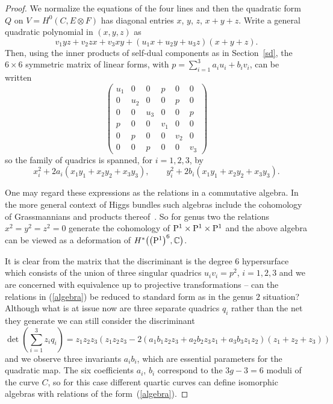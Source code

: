 \documentclass[10pt,a4paper]{amsart}
\numberwithin{equation}{section}
\begin{document}
\begin{proof}
We normalize the equations of the four lines and then the quadratic form $Q$ on $V=H^0(C,E\otimes F)$ has diagonal entries $x$, $y$, $z$, $x+y+z$.
 Write a general quadratic polynomial in $(x,y,z)$ as
 \[ v_1yz+v_2zx+v_3xy+(u_1x+u_2y+u_3z)(x+y+z).\]
Then, using the inner products of self-dual components as in Section~\ref{sd}, the $6\times 6$ symmetric matrix of linear forms, with $p=\sum_{i=1}^3 a_iu_i+b_iv_i$, can be written
 \[ \begin{pmatrix} u_1 & 0 & 0 & p & 0 & 0\\
 0 & u_2 & 0 & 0 & p & 0\\
 0 & 0 & u_3 & 0 & 0 & p\\
 p & 0 & 0 & v_1 & 0 & 0 \\
 0 & p & 0 & 0 & v_2 & 0\\
 0 & 0 & p & 0 & 0 & v_3\end{pmatrix}
 \]
so the family of quadrics is spanned, for $i=1,2,3$, by
\begin{equation}
x_i^2+2a_i(x_1y_1+x_2y_2+x_3y_3), \qquad y_i^2+2b_i(x_1y_1+x_2y_2+x_3y_3).
\label{algebra}
\end{equation}
\begin{Remark} One may regard these expressions as the relations in a commutative algebra. In the more general context of Higgs bundles such algebras include the cohomology of Grassmannians and products thereof~\cite{Hausel/Hitchin}. So for genus two the relations $x^2=y^2=z^2=0$ generate the cohomology of ${\rm P}^1\times {\rm P}^1\times {\rm P}^1$ and the above algebra can be viewed as a deformation of $H^*\big(\big({\rm P}^1\big)^6,{\mathbb C}\big)$.
\end{Remark}
 It is clear from the matrix that the discriminant is the degree $6$ hypersurface which consists of the union of three singular quadrics $u_iv_i=p^2$, $i=1,2,3$ and we are concerned with equivalence up to projective transformations -- can the relations in (\ref{algebra}) be reduced to standard form as in the genus $2$ situation? Although what is at issue now are three separate quadrics $q_i$ rather than the net they generate we can still consider the discriminant
\[ \det\left(\sum_{i=1}^3 z_i q_i\right)=z_1z_2z_3(z_1z_2z_3-2(a_1b_1z_2z_3+a_2b_2z_3z_1+a_3b_3 z_1z_2)(z_1+z_2+z_3))\]
 and we observe three invariants $a_ib_i$, which are essential parameters for the quadratic map. The six coefficients $a_i$, $b_i$ correspond to the $3g-3=6$ moduli of the curve $C$, so for this case different quartic curves can define isomorphic algebras with relations of the form~(\ref{algebra}).
 \end{proof}
\end{document}
